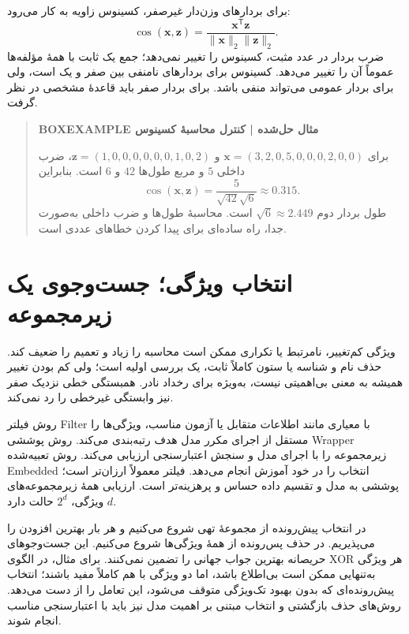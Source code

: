 برای بردارهای وزن‌دار غیرصفر، کسینوس زاویه به کار می‌رود:
\[\operatorname{cos}(\mathbf x,\mathbf z)=\frac{\mathbf x^\mathsf T\mathbf z}{\|\mathbf x\|_2\|\mathbf z\|_2}.\]
ضرب بردار در عدد مثبت، کسینوس را تغییر نمی‌دهد؛ جمع یک ثابت با همهٔ مؤلفه‌ها عموماً آن را تغییر می‌دهد. کسینوس برای بردارهای نامنفی بین صفر و یک است، ولی برای بردار عمومی می‌تواند منفی باشد. برای بردار صفر باید قاعدهٔ مشخصی در نظر گرفت.

\begin{quote}\textbf{BOXEXAMPLE مثال حل‌شده | کنترل محاسبهٔ کسینوس}\par 
برای $\mathbf x=(3,2,0,5,0,0,0,2,0,0)$ و $\mathbf z=(1,0,0,0,0,0,0,1,0,2)$، ضرب داخلی $5$ و مربع طول‌ها $42$ و $6$ است. بنابراین
\[\operatorname{cos}(\mathbf x,\mathbf z)=\frac5{\sqrt{42}\sqrt6}\approx0.315.\]
طول بردار دوم $\sqrt6\approx2.449$ است. محاسبهٔ طول‌ها و ضرب داخلی به‌صورت جدا، راه ساده‌ای برای پیدا کردن خطاهای عددی است.
\end{quote}

\section{انتخاب ویژگی؛ جست‌وجوی یک زیرمجموعه}
ویژگی کم‌تغییر، نامرتبط یا تکراری ممکن است محاسبه را زیاد و تعمیم را ضعیف کند. حذف نام و شناسه یا ستون کاملاً ثابت، یک بررسی اولیه است؛ ولی کم بودن تغییر همیشه به معنی بی‌اهمیتی نیست، به‌ویژه برای رخداد نادر. همبستگی خطی نزدیک صفر نیز وابستگی غیرخطی را رد نمی‌کند.

روش فیلتر Filter با معیاری مانند اطلاعات متقابل یا آزمون مناسب، ویژگی‌ها را مستقل از اجرای مکرر مدل هدف رتبه‌بندی می‌کند. روش پوششی Wrapper زیرمجموعه را با اجرای مدل و سنجش اعتبارسنجی ارزیابی می‌کند. روش تعبیه‌شده Embedded انتخاب را در خود آموزش انجام می‌دهد. فیلتر معمولاً ارزان‌تر است؛ پوششی به مدل و تقسیم داده حساس و پرهزینه‌تر است. ارزیابی همهٔ زیرمجموعه‌های $d$ ویژگی، $2^d$ حالت دارد.

در انتخاب پیش‌رونده از مجموعهٔ تهی شروع می‌کنیم و هر بار بهترین افزودن را می‌پذیریم. در حذف پس‌رونده از همهٔ ویژگی‌ها شروع می‌کنیم. این جست‌وجوهای حریصانه بهترین جواب جهانی را تضمین نمی‌کنند. برای مثال، در الگوی XOR هر ویژگی به‌تنهایی ممکن است بی‌اطلاع باشد، اما دو ویژگی با هم کاملاً مفید باشند؛ انتخاب پیش‌رونده‌ای که بدون بهبود تک‌ویژگی متوقف می‌شود، این تعامل را از دست می‌دهد. روش‌های حذف بازگشتی و انتخاب مبتنی بر اهمیت مدل نیز باید با اعتبارسنجی مناسب انجام شوند.

